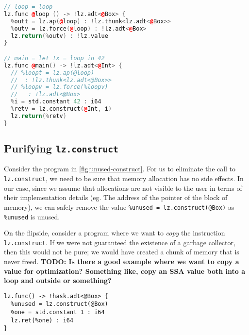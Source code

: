 \documentclass[sigplan,\review anonymous]{acmart}
\newcommand{\lzforce}{\texttt{lz.force}}
\newcommand{\lzconstruct}{\texttt{lz.construct}}
\begin{document}
\begin{lstlisting}[language=c++, caption=Under the assumption that divergence is UB we can eliminate the call to \lzforce. This regains SSA semantics.]
// loop = loop
lz.func @loop () -> !lz.adt<@Box> {
  %outt = lz.ap(@loop) : !lz.thunk<lz.adt<@Box>> 
  %outv = lz.force(@loop) : !lz.adt<@Box>
  lz.return(%outv) : !lz.value
}

// main = let !x = loop in 42
lz.func @main() -> !lz.adt<@Int> {
  // %loopt = lz.ap(@loop) 
  //  : !lz.thunk<lz.adt<@Box>>
  // %loopv = lz.force(%loopv) 
  //   : !lz.adt<@Box> 
  %i = std.constant 42 : i64
  %retv = lz.construct(@Int, i)
  lz.return(%retv)
}
\end{lstlisting}



\subsection{Purifying \lzconstruct}

Consider the program in \autoref{fig:unused-construct}. For us to eliminate
the call to \texttt{lz.construct}, we need to be sure that memory allocation
has no side effects. In our case, since we assume that allocations are not
visible to the user in terms of their implementation details (eg. The address
of the pointer of the block of memory), we can safely remove the value
\texttt{\%unused = lz.construct(@Box)}  as \texttt{\%unused} is unused.


On the flipside, consider a program where we want to \emph{copy} the 
instruction \texttt{lz.construct}. If we were not guaranteed the existence
of a garbage collector, then this would not be pure; we would have created a
chunk of memory that is never freed. \textbf{TODO: Is there a good example where we 
want to copy a value for optimization? Something like, copy an SSA value both
into a loop and outside or something?}



\begin{lstlisting}[caption=An unused called to \lzconstruct]
lz.func() -> !hask.adt<@Box> {
  %unused = lz.construct(@Box)
  %one = std.constant 1 : i64
  lz.ret(%one) : i64
}
\end{lstlisting}
\end{document}
